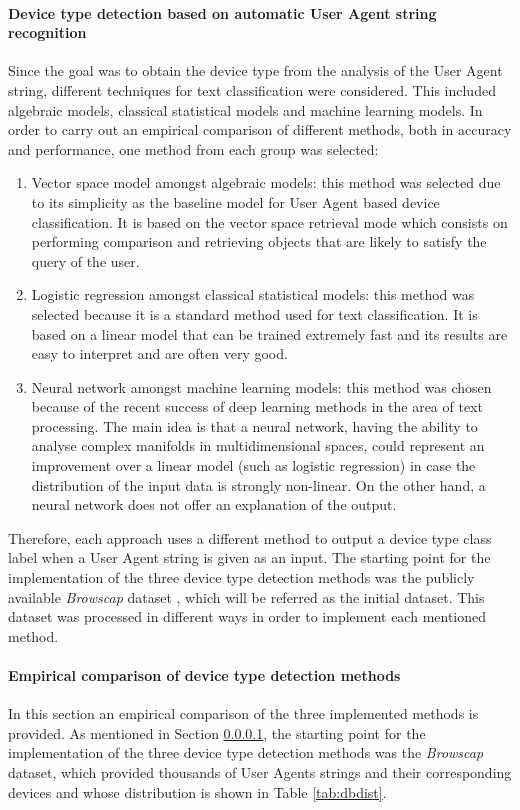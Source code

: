 \paragraph{Device type detection based on automatic User Agent string recognition} \label{dp}
Since the goal was to obtain the device type from the analysis of the User Agent string, different techniques for text classification were considered. This included algebraic models, classical statistical models and machine learning models. In order to carry out an empirical comparison of different methods, both in accuracy and performance, one method from each group was selected:
\begin{enumerate}
	\item Vector space model amongst algebraic models: this method was selected due to its simplicity as the baseline model for User Agent based device classification. It is based on the vector space retrieval mode which consists on performing comparison and retrieving objects that are likely to satisfy the query of the user.
	\item Logistic regression amongst classical statistical models: this method was selected because it is a standard method used for text classification. It is based on a linear model that can be trained extremely fast and its results are easy to interpret and are often very good. 
	\item Neural network amongst machine learning models: this method was chosen because of the recent success of deep learning methods in the area of text processing. The main idea is that a neural network, having the ability to analyse complex manifolds in multidimensional spaces, could represent an improvement over a linear model (such as logistic regression) in case the distribution of the input data is strongly non-linear. On the other hand, a neural network does not offer an explanation of the output.
\end{enumerate}

Therefore, each approach uses a different method to output a device type class label when a User Agent string is given as an input. The starting point for the implementation of the three device type detection methods was the publicly available \textit{Browscap} dataset \cite{browscap}, which will be referred as the initial dataset. This dataset was processed in different ways in order to implement each mentioned method. 

\paragraph{Empirical comparison of device type detection methods} \label{val}
In this section an empirical comparison of the three implemented methods is provided. As mentioned in Section \ref{dp}, the starting point for the implementation of the three device type detection methods was the \textit{Browscap} \cite{browscap} dataset, which provided thousands of User Agents strings and their corresponding devices and whose distribution is shown in Table \ref{tab:dbdist}.

